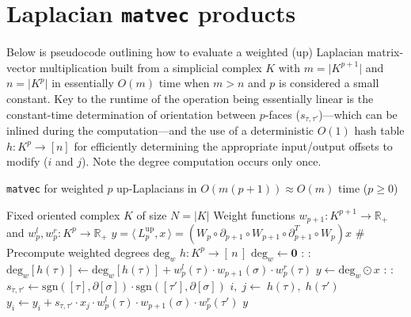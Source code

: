 \documentclass[10pt]{article}
\numberwithin{equation}{section}
\newcommand{\+}{%
	\raisebox{0.18ex}{\scaleobj{0.55}{+}}
}
\theoremstyle{definition}
\theoremstyle{definition}
\begin{document}
\section{Laplacian \texttt{matvec} products}\label{sec:up_laplace_matvec}
Below is pseudocode outlining how to evaluate a weighted (up) Laplacian matrix-vector multiplication built from a simplicial complex $K$ with $m = \lvert K^{p+1} \rvert$ and $n = \lvert K^{p} \rvert$ in essentially $O(m)$ time when $m > n$ and $p$ is considered a small constant. 
Key to the runtime of the operation being essentially linear is the constant-time determination of orientation between $p$-faces ($s_{\tau, \tau'}$)---which can be inlined during the computation---and the use of a deterministic $O(1)$ hash table $h : K^{p} \to [n]$ for efficiently determining the appropriate input/output offsets to modify ($i$ and $j$). 
Note the degree computation occurs only once. 

\begin{algorithm}[H]\label{alg:lap_matvec}
\renewcommand{\algorithmicensure}{\textbf{Optional:}}
\caption{\texttt{matvec} for weighted $p$ up-Laplacians in $O(m(p+1)) \approx O(m)$ time ($p \geq 0$)}
\begin{algorithmic}[1]
\Require Fixed oriented complex $K$ of size $N=\lvert K \rvert$ 
\Ensure Weight functions $w_{p+1}: K^{p+1} \to \mathbb{R}_{+}$ and  $w_{p}^l, w_{p}^r: K^p \to \mathbb{R}_{+}$
\renewcommand{\algorithmicensure}{\textbf{Output:}}
\Ensure $y = \langle \, L_p^{\mathrm{up}}, x \, \rangle =  (W_p \circ \partial_{p+1} \circ W_{p+1} \circ \partial_{p+1}^T \circ W_p)x$
\State \# Precompute weighted degrees $\mathrm{deg}_w$ 
\State $h : K^p \to [ \, n \, ]$ 
\State $\mathrm{deg}_w \gets \mathbf{0}$
: 
	\For{$\tau \in \partial[\sigma]$}:
   	 	\State $\mathrm{deg}_w[h(\tau)] \gets \mathrm{deg}_w[h(\tau)] + w_p^l(\tau) \cdot w_{p+1}(\sigma) \cdot  w_{p}^r(\tau)$
   	\EndFor
\EndFor
\State 
\State $y \gets \mathrm{deg}_w \odot x$ \; 
:
    : 
    		\State $s_{\tau, \tau'} \gets \mathrm{sgn}([\tau], \partial[\sigma]) \cdot \mathrm{sgn}([\tau'], \partial[\sigma])$
    		\State $i, \; j \gets \; h(\tau), \; h(\tau')$
    		\State $y_i \gets y_i + s_{\tau, \tau'} \cdot x_{j} \cdot w_p^l(\tau) \cdot w_{p+1}(\sigma) \cdot w_p^r(\tau')$
    \EndFor 
\EndFor
\State \Return $y$
\EndFunction
\end{algorithmic}
\end{algorithm}
\end{document}
